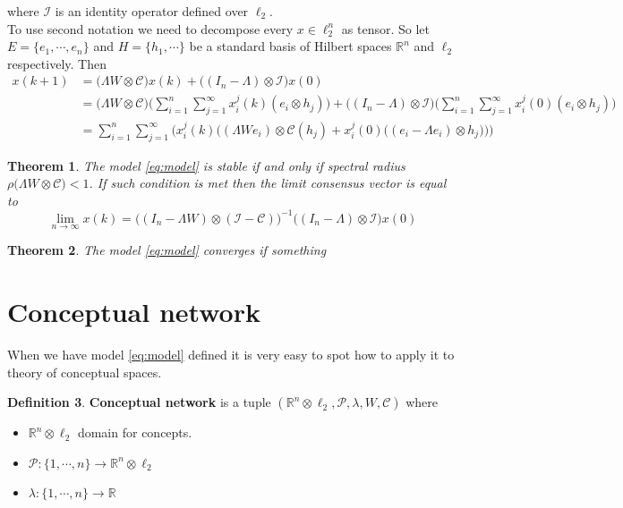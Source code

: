 \documentclass[leqno,12pt]{amsart}
\newtheorem{theorem}{Theorem}[section]
\theoremstyle{remark}
\theoremstyle{remark}
\theoremstyle{remark}
\theoremstyle{definition}
\newtheorem{definition}[theorem]{Definition}
\numberwithin{equation}{section}
\newcommand{\R}{\ensuremath{\mathbb{R}}}
\begin{document}
where $\mathcal{I}$ is an identity operator defined over $\ell_2$.\\
To use second notation we need to decompose every $x \in \ell_2^n$ as tensor. So let $E = \{ e_1, \cdots, e_n\}$ and $H = \{ h_1, \cdots\}$ be a standard basis of Hilbert spaces $\R^n$ and $\ell_2$ respectively. Then
\begin{align*}
    x(k+1) &= \big(\Lambda W\otimes \mathcal{C}\big)x(k) + \big((I_n - \Lambda)\otimes \mathcal{I}\big)x(0) \\
    &= \big(\Lambda W\otimes \mathcal{C}\big)\big(\sum\limits_{i=1}^n\sum\limits_{j=1}^\infty x^j_i(k)(e_i\otimes h_j)\big) + \big((I_n - \Lambda)\otimes \mathcal{I}\big)\big(\sum\limits_{i=1}^n\sum\limits_{j=1}^\infty x^j_i(0)(e_i\otimes h_j)\big)\\
    &= \sum\limits_{i=1}^n\sum\limits_{j=1}^\infty \Big(
    x_i^j(k)\big((\Lambda W e_i)\otimes \mathcal{C}(h_j) + x_i^j(0) \big((e_i-\Lambda e_i)\otimes h_j\big)\big)
    \Big)
\end{align*}
\begin{theorem}\label{th:stab_inf}
    The model \ref{eq:model} is stable if and only if spectral radius $\rho\big(\Lambda W\otimes \mathcal{C}\big) < 1$. If such condition is met then the limit \textit{consensus} vector is equal to
    \begin{equation}
        \lim\limits_{n\to \infty}x(k) = \big((I_n-\Lambda W)\otimes (\mathcal{I}- \mathcal{C})\big)^{-1}\big((I_n-\Lambda)\otimes \mathcal{I}\big)x(0)
    \end{equation}
\end{theorem}
\begin{theorem}
    The model \ref{eq:model} converges if something

\end{theorem}
\section{Conceptual network}
When we have model \ref{eq:model} defined it is very easy to spot how to apply it to theory of conceptual spaces.
\begin{definition}
    \textbf{Conceptual network} is a tuple $(\R^n\otimes \ell_2, \mathcal{P}, \lambda,  W, \mathcal{C})$ where
    \begin{itemize}
        \item $\R^n\otimes \ell_2$ domain for concepts.
        \item $\mathcal{P} :\{1,\cdots, n\} \to \R^n\otimes \ell_2$
        \item $\lambda : \{1,\cdots, n\} \to \R$
    \end{itemize}
\end{definition}
\end{document}
